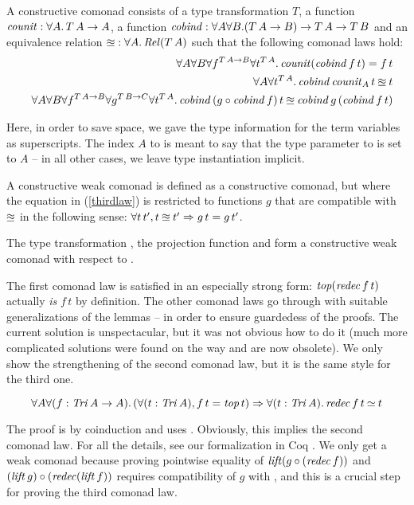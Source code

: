\begin{definition}
  A constructive comonad consists of a type transformation $T$, a
  function $\mathit{counit}:\forall A.\,T\,A\to A$, a function
  $\mathit{cobind}:\forall A\forall B.(T\,A\to B)\to T\,A\to T\,B$ and an
  equivalence relation $\mathbin{\approxeq}:\forall A.\,\mathit{Rel}(T\,A)$ such that the
  following comonad laws hold:
\begin{eqnarray}
&&\forall A\forall B\forall f^{T\,A\to B}\forall t^{T\,A}.\, \mathit{counit} (\mathit{cobind}\,f\,t) = f\,t \\
&&\forall A\forall t^{T\,A}.\,\mathit{cobind}\,\mathit{counit}_A\,t \mathbin{\approxeq} t \\
&&\forall A\forall B\forall f^{T\, A \to B}\forall g^{T\, B \to C}\forall t^{T\, A}.\,\mathit{cobind}\,(g \circ \mathit{cobind}\,f)\,t \mathbin{\approxeq}\mathit{cobind}\,g\,(\mathit{cobind}\,f\,t)\label{thirdlaw}
  \end{eqnarray}
\end{definition}
Here, in order to save space, we gave the type information for the
term variables as superscripts. The index $A$ to \counit{} is meant to
say that the type parameter to \counit{} is set to $A$ -- in all other
cases, we leave type instantiation implicit.

\begin{definition}
  A constructive weak comonad is defined as a constructive comonad,
  but where the equation in (\ref{thirdlaw}) is restricted to
  functions $g$ that are compatible with $\mathbin{\approxeq}$ in the following
  sense: $\forall t\,t', t \mathbin{\approxeq} t' \Rightarrow g\,t = g\,t'$.
\end{definition}

\begin{lemma}\label{lemma:TriWComonad}
  The type transformation \Tri{}, the projection function \topT{} and
  \redec{} form a constructive weak comonad with respect to \bisim{}.
\end{lemma}

The first comonad law is satisfied in an especially strong form:
$\mathit{top}(\mathit{redec}\,f\,t)$ actually \emph{is} $f\,t$ by definition.  The
other comonad laws go through with suitable generalizations of the
lemmas -- in order to ensure guardedess of the proofs. The current
solution is unspectacular, but it was not obvious how to do it (much
more complicated solutions were found on the way and are now
obsolete). We only show the strengthening of the second comonad law,
but it is the same style for the third one.
\begin{lemma}
  $$\forall A\forall (f:\mathit{Tri}\,A\to A).\,(\forall (t:\mathit{Tri}\,A), f\,t = \mathit{top}\,t) \Rightarrow \forall (t:\mathit{Tri}\,A).\,\mathit{redec}\,f\,t\mathbin{\simeq} t$$
\end{lemma}
The proof is by coinduction and uses . Obviously, this
implies the second comonad law.  For all the details, see our
formalization in Coq
\cite{TYPES11code}. We only get a weak comonad because proving
pointwise equality of $\mathit{lift} (g \circ (\mathit{redec}\,f))$ and $(\mathit{lift}\, g)
\circ (\mathit{redec} (\mathit{lift}\,f))$ requires compatibility of $g$ with
\bisim{}, and this is a crucial step for proving the third comonad
law.

